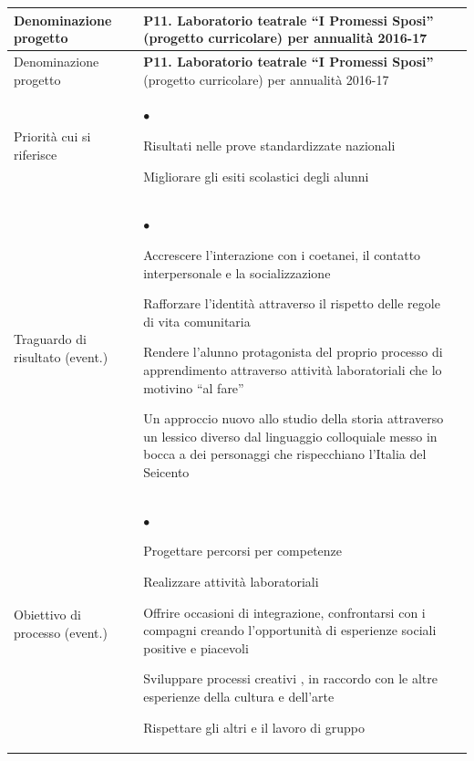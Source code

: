 \documentclass[12pt,a4paper,oneside]{memoir}
\newenvironment{elenco}{\begin{list}{$\bullet$}{%
              \setlength{\leftmargin}{4mm}%
              \setlength{\rightmargin}{1mm}%
               \setlength{\itemindent}{0mm}%
               \setlength{\labelwidth}{2mm}%
               \setlength{\labelsep}{2mm}%
              \setlength{\itemsep}{-\parsep}%
              \setlength{\partopsep}{0pt}%
              \setlength{\topsep}{0pt}%
             \setlength{\parskip}{0pt}%
              }}{\end{list}}
\begin{document}
\vspace{24pt}

\begin{footnotesize}
\begin{longtable}{|>{\raggedright}p{2.5cm}|>{\raggedright\arraybackslash}P{10cm}|}
\hline
{}
\label{P11}Denominazione progetto&\textbf{P11. Laboratorio teatrale ``I Promessi Sposi''} (progetto curricolare) per annualità 2016-17\\ \hline \endfirsthead
\hline
{}
Denominazione progetto&\textbf{P11. Laboratorio teatrale ``I Promessi Sposi''} (progetto curricolare) per annualità 2016-17\\ \hline \endhead
{}
\endfoot
\hline
\endlastfoot
Priorità cui si riferisce&
\begin{elenco}
\item Risultati nelle prove standardizzate nazionali
\item Migliorare gli esiti scolastici degli alunni
\end{elenco}\\[-4mm] \hline
Traguardo di risultato (event.)&
\begin{elenco}
\item Accrescere l'interazione con i coetanei, il contatto interpersonale e la socializzazione
\item Rafforzare l'identità attraverso il rispetto delle regole di vita comunitaria 
\item Rendere l'alunno protagonista del proprio processo di apprendimento attraverso attività laboratoriali che lo motivino “al fare”
\item Un approccio nuovo allo studio della storia attraverso un lessico diverso dal linguaggio colloquiale messo in bocca a dei personaggi che rispecchiano l'Italia del Seicento
\end{elenco}\\ \hline
Obiettivo di processo (event.)&
\begin{elenco}
\item Progettare percorsi per competenze
\item Realizzare attività laboratoriali 
\item Offrire occasioni di integrazione, confrontarsi con i compagni creando l'opportunità di esperienze sociali positive e piacevoli
\item Sviluppare processi creativi , in raccordo con le altre esperienze della cultura e dell'arte
\item Rispettare gli altri e il lavoro di gruppo

\end{elenco}
\end{longtable}
\end{footnotesize}
\end{document}

